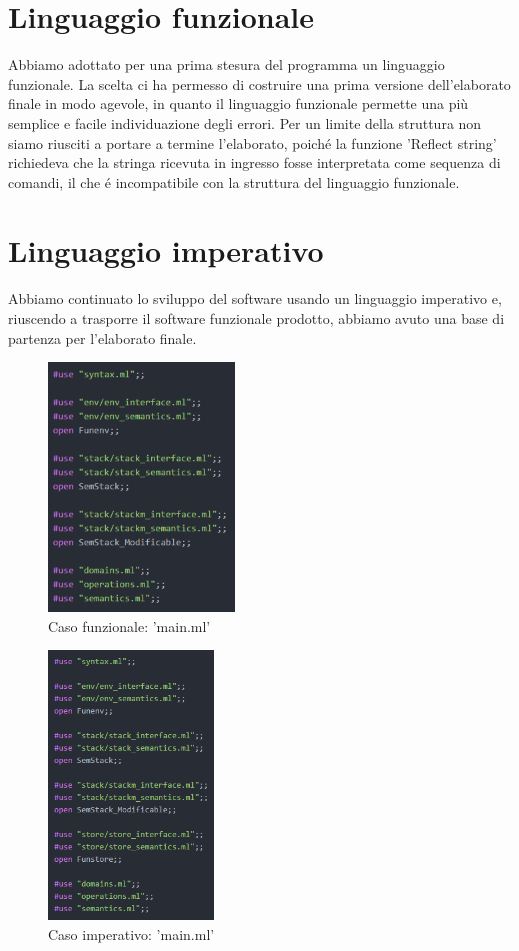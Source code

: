 \documentclass[a4paper,titlepage]{book}
\begin{document}
\section{Linguaggio funzionale}
Abbiamo adottato per una prima stesura del programma un linguaggio funzionale.
La scelta ci ha permesso di costruire una prima versione dell'elaborato finale in modo agevole, in quanto il linguaggio
funzionale permette una più semplice e facile individuazione degli errori.
Per un limite della struttura non siamo riusciti a portare a termine l'elaborato, poich\'e la funzione 'Reflect string' richiedeva che la
stringa ricevuta in ingresso fosse interpretata come sequenza di comandi, il che \'e incompatibile con la struttura del
linguaggio funzionale.

\section{Linguaggio imperativo}
Abbiamo continuato lo sviluppo del software usando un linguaggio imperativo e, riuscendo a trasporre il software funzionale 
prodotto, abbiamo avuto una base di partenza per l'elaborato finale.

\begin{figure}[H]
\center
\includegraphics[height=250px]{img/main_funzionale.png}
\caption{Caso funzionale: 'main.ml' \label{fig:main_funzionale}}
\end{figure}

\begin{figure}[H]
\center
\includegraphics[height=270px]{img/main_imperativo.png}
\caption{Caso imperativo: 'main.ml' \label{fig:main_imperativo}}
\end{figure}
\end{document}
